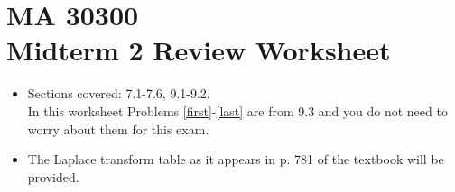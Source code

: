 \documentclass[11 pt]{article}
\title{}
\author{Nikolas Eptaminitakis}
\begin{document}
\section*{MA 30300 \\Midterm 2 Review Worksheet}

\begin{itemize}
    \item  Sections covered: 7.1-7.6, 9.1-9.2. \\
    In this worksheet Problems \ref{first}-\ref{last} are from 9.3 and you do not need to worry about them for this exam.



 \item  The Laplace transform table as it appears in p. 781 of the textbook will be provided.


\end{itemize}
\end{document}
